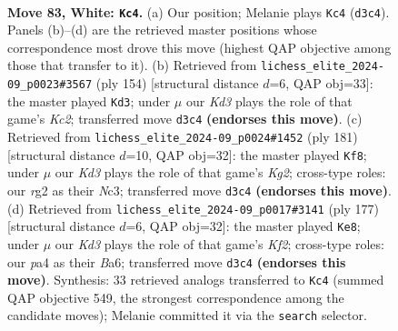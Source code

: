 \documentclass[11pt]{article}
\begin{document}
\clearpage

\begin{figure}[p]\centering
\begin{subfigure}{0.46\textwidth}\centering
\resizebox{\linewidth}{!}{%
\newchessgame
\chessboard[
  setfen={8/8/8/2p2k2/p2p4/3K4/6r1/8 w - - 6 83},
  showmover=false,
  pgfstyle=straightmove, color=movearrow, markmove={d3-c4}
]}
\caption{}
\end{subfigure}\hfill
\begin{subfigure}{0.46\textwidth}\centering
\resizebox{\linewidth}{!}{%
\newchessgame
\chessboard[
  setfen={8/8/8/8/k7/2p5/ppK5/8 w - - 0 78},
  showmover=false,
  pgfstyle=straightmove, color=movearrow, markmove={c2-d3}
]}
\caption{}
\end{subfigure}
\\[4pt]
\begin{subfigure}{0.46\textwidth}\centering
\resizebox{\linewidth}{!}{%
\newchessgame
\chessboard[
  setfen={8/5Pk1/4K1P1/8/8/2n5/8/8 b - - 10 91},
  showmover=false,
  pgfstyle=straightmove, color=movearrow, markmove={g7-f8}
]}
\caption{}
\end{subfigure}\hfill
\begin{subfigure}{0.46\textwidth}\centering
\resizebox{\linewidth}{!}{%
\newchessgame
\chessboard[
  setfen={8/4Pk2/b4P2/2R5/8/8/6K1/8 b - - 2 89},
  showmover=false,
  pgfstyle=straightmove, color=movearrow, markmove={f7-e8}
]}
\caption{}
\end{subfigure}
\caption{\textbf{Move 83, White: \texttt{Kc4}.} (a) Our position; Melanie plays \texttt{Kc4} (\texttt{d3c4}). Panels (b)--(d) are the retrieved master positions whose correspondence most drove this move (highest QAP objective among those that transfer to it). (b) Retrieved from \texttt{lichess\_elite\_2024-09\_p0023\#3567} (ply 154) [structural distance $d$=6, QAP obj=33]: the master played \texttt{Kd3}; under $\mu$ our \emph{Kd3} plays the role of that game's \emph{Kc2}; transferred move \texttt{d3c4} \textbf{(endorses this move)}. (c) Retrieved from \texttt{lichess\_elite\_2024-09\_p0024\#1452} (ply 181) [structural distance $d$=10, QAP obj=32]: the master played \texttt{Kf8}; under $\mu$ our \emph{Kd3} plays the role of that game's \emph{Kg2}; cross-type roles: our \emph{r}g2 as their \emph{N}c3; transferred move \texttt{d3c4} \textbf{(endorses this move)}. (d) Retrieved from \texttt{lichess\_elite\_2024-09\_p0017\#3141} (ply 177) [structural distance $d$=6, QAP obj=32]: the master played \texttt{Ke8}; under $\mu$ our \emph{Kd3} plays the role of that game's \emph{Kf2}; cross-type roles: our \emph{p}a4 as their \emph{B}a6; transferred move \texttt{d3c4} \textbf{(endorses this move)}. Synthesis: 33 retrieved analogs transferred to \texttt{Kc4} (summed QAP objective 549, the strongest correspondence among the candidate moves); Melanie committed it via the \texttt{search} selector.}
\label{fig:thought-m164}
\end{figure}
\end{document}
